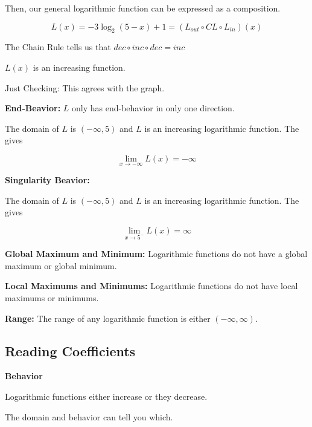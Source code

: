 \documentclass{ximera}
\begin{document}
\begin{example}
Then, our general logarithmic function can be expressed as a composition.


\[
 L(x) = -3 \log_2(5-x)+1 = (L_{out} \circ CL \circ L_{in})(x)
\]


The Chain Rule tells us that $dec \circ inc \circ dec = inc$

$L(x)$ is an increasing function.

Just Checking: This agrees with the graph.





\textbf{End-Beavior:} $L$ only has end-behavior in only one direction.

The domain of $L$ is $(-\infty, 5)$ and $L$ is an increasing logarithmic function.  The gives

\[ \lim\limits_{x \to -\infty} L(x) = -\infty \]







\textbf{Singularity Beavior:} 


The domain of $L$ is $(-\infty, 5)$ and $L$ is an increasing logarithmic function.  The gives

\[ \lim\limits_{x \to 5^-} L(x) = \infty \]





\textbf{Global Maximum and Minimum:}  Logarithmic functions do not have a global maximum or global minimum.

\textbf{Local Maximums and Minimums:} Logarithmic functions do not have local maximums or minimums.

\textbf{Range:} The range of any logarithmic function is either $(-\infty, \infty)$.




\end{example}











\subsection*{Reading Coefficients}


\textbf{Behavior}


Logarithmic functions either increase or they decrease.

The domain and behavior can tell you which.
\end{document}
